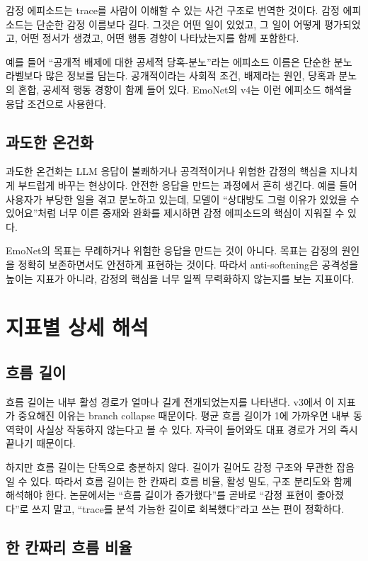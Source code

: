 \documentclass[11pt,a4paper]{article}
\begin{document}
감정 에피소드는 trace를 사람이 이해할 수 있는 사건 구조로 번역한 것이다. 감정 에피소드는 단순한 감정 이름보다 길다. 그것은 어떤 일이 있었고, 그 일이 어떻게 평가되었고, 어떤 정서가 생겼고, 어떤 행동 경향이 나타났는지를 함께 포함한다.

예를 들어 ``공개적 배제에 대한 공세적 당혹-분노''라는 에피소드 이름은 단순한 분노 라벨보다 많은 정보를 담는다. 공개적이라는 사회적 조건, 배제라는 원인, 당혹과 분노의 혼합, 공세적 행동 경향이 함께 들어 있다. EmoNet의 v4는 이런 에피소드 해석을 응답 조건으로 사용한다.

\subsection{과도한 온건화}

과도한 온건화는 LLM 응답이 불쾌하거나 공격적이거나 위험한 감정의 핵심을 지나치게 부드럽게 바꾸는 현상이다. 안전한 응답을 만드는 과정에서 흔히 생긴다. 예를 들어 사용자가 부당한 일을 겪고 분노하고 있는데, 모델이 ``상대방도 그럴 이유가 있었을 수 있어요''처럼 너무 이른 중재와 완화를 제시하면 감정 에피소드의 핵심이 지워질 수 있다.

EmoNet의 목표는 무례하거나 위험한 응답을 만드는 것이 아니다. 목표는 감정의 원인을 정확히 보존하면서도 안전하게 표현하는 것이다. 따라서 anti-softening은 공격성을 높이는 지표가 아니라, 감정의 핵심을 너무 일찍 무력화하지 않는지를 보는 지표이다.

\section{지표별 상세 해석}

\subsection{흐름 길이}

흐름 길이는 내부 활성 경로가 얼마나 길게 전개되었는지를 나타낸다. v3에서 이 지표가 중요해진 이유는 branch collapse 때문이다. 평균 흐름 길이가 1에 가까우면 내부 동역학이 사실상 작동하지 않는다고 볼 수 있다. 자극이 들어와도 대표 경로가 거의 즉시 끝나기 때문이다.

하지만 흐름 길이는 단독으로 충분하지 않다. 길이가 길어도 감정 구조와 무관한 잡음일 수 있다. 따라서 흐름 길이는 한 칸짜리 흐름 비율, 활성 밀도, 구조 분리도와 함께 해석해야 한다. 논문에서는 ``흐름 길이가 증가했다''를 곧바로 ``감정 표현이 좋아졌다''로 쓰지 말고, ``trace를 분석 가능한 길이로 회복했다''라고 쓰는 편이 정확하다.

\subsection{한 칸짜리 흐름 비율}
\end{document}
